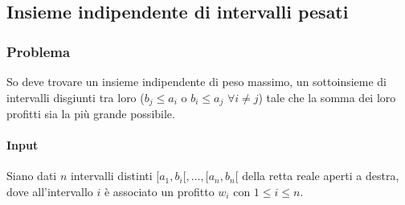 \subsection{Insieme indipendente di intervalli pesati}
\subsubsection{Problema}
So deve trovare un insieme indipendente di peso massimo, un sottoinsieme di intervalli disgiunti tra loro ($b_j \le a_i$ o $b_i\le a_j$ $\forall i\neq j$) tale che la somma dei loro 
profitti sia la pi\`u grande possibile.
\paragraph{Input}
Siano dati $n$ intervalli distinti $[a_1, b_i[, \dots, [a_n, b_n[$ della retta reale aperti a destra, dove all'intervallo $i$ \`e associato un profitto $w_i$ con $1\le i\le n$.
